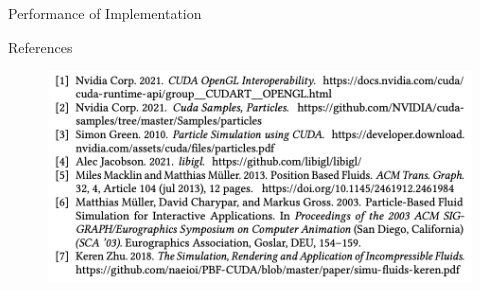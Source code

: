 \documentclass[aspectratio=169,xcolor=dvipsnames]{beamer}
\begin{document}
\begin{frame}{Performance of Implementation}
    

\end{frame}


\begin{frame}{References}
    \begin{figure}
        \includegraphics[width=1.0\linewidth]{../image/reference.png}
        \end{figure}
    
\end{frame}
\end{document}
